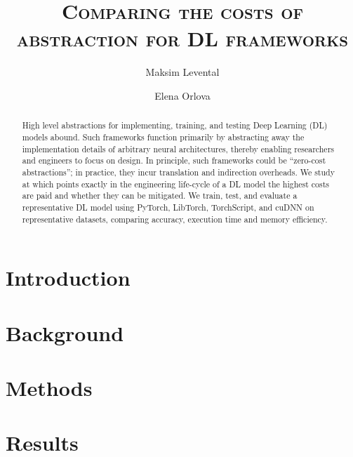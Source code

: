 \documentclass[sigconf]{acmart}
\begin{document}
\title{\textsc{Comparing the costs of abstraction for DL frameworks}}

\author{Maksim Levental}
\author{Elena Orlova}

\renewcommand{\shortauthors}{Levental and Orlova}

\begin{abstract}
  High level abstractions for implementing, training, and testing Deep Learning (DL) models abound.
  Such frameworks function primarily by abstracting away the implementation details of arbitrary neural architectures, thereby enabling researchers and engineers to focus on design.
  In principle, such frameworks could be ``zero-cost abstractions'';
  in practice, they incur translation and indirection overheads.
  We study at which points exactly in the engineering life-cycle of a DL model the highest costs are paid and whether they can be mitigated.
  We train, test, and evaluate a representative DL model using PyTorch, LibTorch, TorchScript, and cuDNN on representative datasets, comparing accuracy, execution time and memory efficiency.
\end{abstract}


\maketitle

\section{Introduction}\label{sec:introduction}


\section{Background}\label{sec:background}


\section{Methods}\label{sec:methodology}


\section{Results}\label{sec:results}

\end{document}
